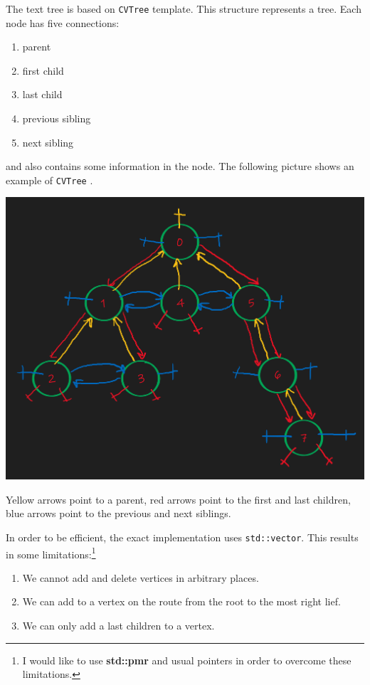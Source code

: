 \documentclass{article}
\begin{document}
The text tree is based on \verb"CVTree" template. This structure represents a tree. Each node has five connections:
\begin{enumerate}
\item parent
\item first child
\item last child
\item previous sibling
\item next sibling
\end{enumerate}
and also contains some information in the node. The following picture shows an example of \verb"CVTree" .
\begin{center}
\includegraphics[scale = 0.2]{Figures/VTree.png}

Yellow arrows point to a parent, red arrows point to the first and last children, blue arrows point to the previous and next siblings.
\end{center}

In order to be efficient, the exact implementation uses \verb"std::vector". This results in some limitations:\footnote{I would like to use \textbf{std::pmr} and usual pointers in order to overcome these limitations.}
\begin{enumerate}
\item We cannot add and delete vertices in arbitrary places.
\item We can add to a vertex on the route from the root to the most right lief.
\item We can only add a last children to a vertex.
\end{enumerate}
\end{document}
